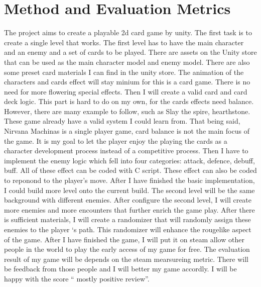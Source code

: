 \documentclass[10pt,twocolumn]{article}
\begin{document}
\section{Method and Evaluation Metrics}
The project aims to create a playable 2d card game by unity. The first task is to create a single level that works. The first level has to have the main character and an enemy and a set of cards to be played. There are assets on the Unity store that can be used as the main character model and enemy model. There are also some preset card materials  I can find in the unity store. The animation of the characters and cards effect will stay minium for this is a card game. There is no need for more flowering special effects. Then I will create a valid card and card deck logic. This part is hard to do on my own, for the cards effects need balance. However, there are many example to follow, such as Slay the spire, hearthstone. These game already have a valid system I could learn from. That being said, Nirvana Machinas is a single player game, card balance is not the main focus of the game. It is my goal to let the player enjoy the playing the cards as a character development process instead of a competitive process. Then I have to implement the enemy logic which fell into four categories: attack, defence, debuff, buff. All of these effect can be coded with C script. These effect can also be coded to reponond to the player’s move. After I have finished the basic implementation, I could build more level onto the current build. The second level will be the same background with different enemies. After configure the second level, I will create more enemies and more encounters that further enrich the game play. After there is sufficient materials, I will create a randomizer that will randomly assign these enemies to the player ‘s path. This randomizer will enhance the rougelike aspect of the game. After I have finished the game, I will put it on steam allow other people in the world to play the early access of my game for free. The evaluation result of my game will be depends on the steam mearsureing metric.  There will be feedback from those people and I will better my game accordly. I will be happy with the score “ mostly positive review”.
\end{document}
